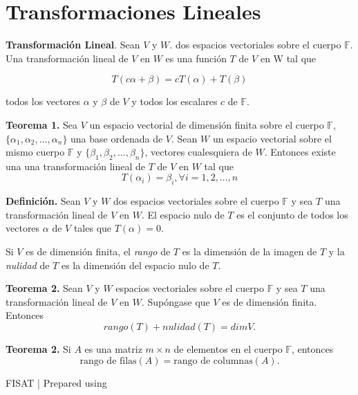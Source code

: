 \newpage

\section{{\Large Transformaciones Lineales}}
\textbf{Transformación Lineal}. Sean $V$ y $W$. dos espacios vectoriales
sobre el cuerpo $\mathbb{F}$. Una transformación lineal de $V$ en $W$
es una función $T$ de $V$ en W tal que

$$T(c\alpha + \beta) = cT(\alpha) + T(\beta)$$

todos los vectores $\alpha$ y $\beta$ de $V$ y todos 
los escalares $c$ de $\mathbb{F}$.

\textbf{Teorema 1.} Sea $V$ un espacio vectorial de dimensión
finita sobre el cuerpo $\mathbb{F}$, $\{\alpha_{1}, \alpha _{2},
\dots, \alpha_{n}\}$ una base ordenada de $V$. Sean $W$ un espacio
vectorial sobre el mismo cuerpo $\mathbb{F}$ y $\{\beta_{1},
\beta _{2}, \dots , \beta_{n} \}$, vectores cualesquiera de $W$.
Entonces existe una una transformación lineal de $T$ de $V$ en
$W$ tal que
$$T(\alpha_{i}) = \beta_{i}, \forall i = 1, 2, \dots, n$$

\textbf{Deﬁnición.} Sean $V$ y $W$ dos espacios vectoriales sobre el
cuerpo $\mathbb{F}$ y sea $T$ una transformación lineal de $V$ en $W$.
El espacio nulo de $T$ es el conjunto de todos los vectores $\alpha$
de $V$ tales que $T(\alpha) = 0$.

Si $V$ es de dimensión finita, el \textit{rango} de $T$ es la
dimensión de la imagen de $T$ y la \textit{nulidad} de $T$ es
la dimensión del espacio nulo de $T$.

\textbf{Teorema 2.} Sean $V$ y $W$ espacios vectoriales sobre el
cuerpo $\mathbb{F}$ y sea $T$ una transformación lineal de $V$
en $W$. Supóngase que $V$ es de dimensión finita. Entonces
$$rango (T) + nulidad (T) = dim V.$$

\textbf{Teorema 2.} Si $A$ es una matriz $m \times n$ de elementos
en el cuerpo $\mathbb{F}$, entonces $$\text{rango de filas} (A)
= \text{rango de columnas} (A).$$

\vfill
\footnotesize{\textcopyright FISAT | Prepared using \LaTeXe}



